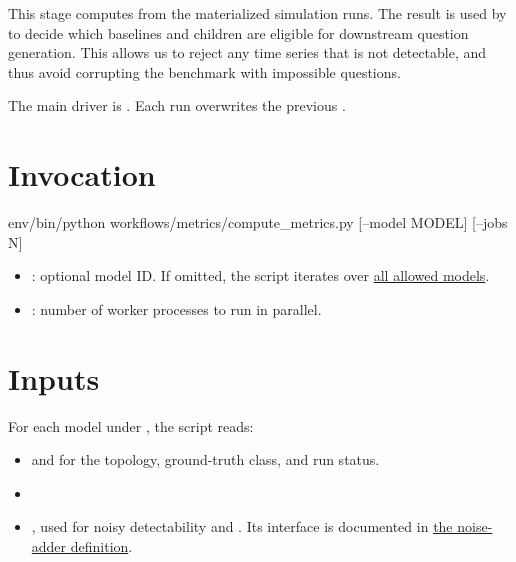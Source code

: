 \documentclass[11pt]{article}
\begin{document}
\label{docstart:compute_metrics_stage}

This stage computes  from the materialized simulation runs.
The result is used by  to decide which baselines and children are eligible for downstream question generation.
This allows us to reject any time series that is not detectable, and thus avoid corrupting the benchmark with impossible questions.

The main driver is .
Each run overwrites the previous .

\section*{Invocation}

\begin{DocCode}
env/bin/python workflows/metrics/compute_metrics.py [--model MODEL] [--jobs N] 
\end{DocCode}

\begin{itemize}
\item {}: optional model ID. If omitted, the script iterates over \hyperref[sec:allowed-tsenv-models]{all allowed \name{} models}.
\item {}: number of worker processes to run in parallel.

\end{itemize}

\section*{Inputs}

For each model under , the script reads:

\begin{itemize}
\item {} and  for the topology, ground-truth class, and run status.
\item {}
\item {}, used for noisy detectability and . Its interface is documented in \hyperref[def:noise-adder-interface]{the noise-adder definition}.
\end{itemize}
\end{document}
